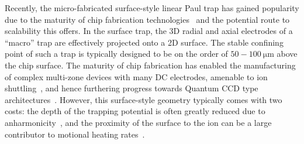     Recently, the micro-fabricated surface-style linear Paul trap has gained
    popularity due to the maturity of chip fabrication
    technologies~\cite{allcock_surface-electrode_2011} and the potential route
    to scalability this offers. In the surface trap, the 3D radial and axial
    electrodes of a ``macro'' trap are effectively projected onto a 2D surface.
    The stable confining point of such a trap is typically designed to be on the order of $50-100~\unit{\micro\meter}$
    above the chip surface. The maturity of chip fabrication has enabled
    the manufacturing of complex multi-zone devices with many DC electrodes, amenable to ion shuttling~\cite{kaushal_shuttling-based_2020, sterk_closed-loop_2022}, and hence furthering progress towards Quantum CCD
    type architectures~\cite{kielpinski_architecture_2002}. However, this
    surface-style geometry typically comes with two costs: the depth of the
    trapping potential is often greatly reduced due to anharmonicity~\cite{home_normal_2011}, and the proximity of the
    surface to the ion can be a large contributor to motional heating
    rates~\cite{wineland_experimental_1998, turchette_heating_2000, brownnutt_ion-trap_2015, boldin_measuring_2018}. 

